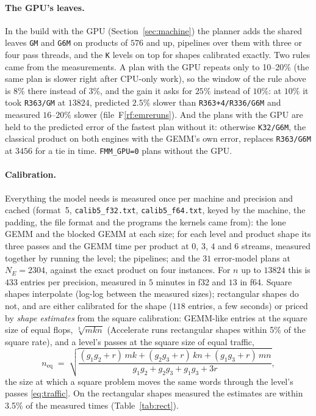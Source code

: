 \documentclass[11pt]{article}
\newcommand{\rf}[1]{F\ref{rf:#1}}
\newcommand{\lv}[1]{\texttt{#1}}
\begin{document}
\paragraph{The GPU's leaves.}
In the build with the GPU (Section~\ref{sec:machine}) the planner adds the
shared leaves \lv{GM} and \lv{G6M} on products of $576$ and up, pipelines over
them with three or four pass threads, and the \lv{K} levels on top for shapes
calibrated exactly.  Two rules came from the measurements.  A plan with the
GPU repeats only to 10--20\% (the same plan is slower right after CPU-only
work), so the window of the rule above is 8\% there instead of 3\%, and the
gain it asks for $25\%$ instead of $10\%$: at $10\%$ it took \lv{R363/GM} at
$13824$, predicted $2.5\%$ slower than \lv{R363+4/R336/G6M} and measured
$16$--$20\%$ slower (file~\rf{emreruns}).  And the
plans with the GPU are held to the predicted error of the fastest plan
without it: otherwise \lv{K32/G6M}, the classical product on both engines
with the GEMM's own error, replaces \lv{R363/G6M} at $3456$ for a tie in
time.  \texttt{FMM\_GPU=0} plans without the GPU.

\paragraph{Calibration.}
Everything the model needs is measured once per machine and precision and
cached (format~5, \texttt{calib5\_f32.txt}, \texttt{calib5\_f64.txt}, keyed by
the machine, the padding, the file format and the programs the kernels came
from): the lone GEMM and the blocked GEMM at each size; for each level and
product shape its three passes and the GEMM time per product at $0$, $3$, $4$
and $6$ streams, measured together by running the level; the pipelines; and
the $31$ error-model plans at $N_E=2304$, against the exact product on four instances.  For $n$ up to $13824$ this is $433$
entries per precision, measured in $5$ minutes in f32 and $13$ in f64.  Square shapes interpolate (log-log
between the measured sizes); rectangular shapes do not, and are either
calibrated for the shape ($118$ entries, a few seconds) or priced by
\emph{shape estimates} from the square calibration: GEMM-like entries at the
square size of equal flops, $\sqrt[3]{mkn}$ (Accelerate runs rectangular shapes
within 5\% of the square rate), and a level's passes at the square size of
equal traffic,
\begin{equation}\label{eq:equiv}
n_{\text{eq}} \;=\; \sqrt{\frac{(g_1g_2+r)\,mk + (g_2g_3+r)\,kn + (g_1g_3+r)\,mn}
{g_1g_2+g_2g_3+g_1g_3+3r}},
\end{equation}
the size at which a square problem moves the same words through the level's
passes \eqref{eq:traffic}.  On the rectangular shapes measured the estimates
are within 3.5\% of the measured times (Table~\ref{tab:rect}).
\end{document}
